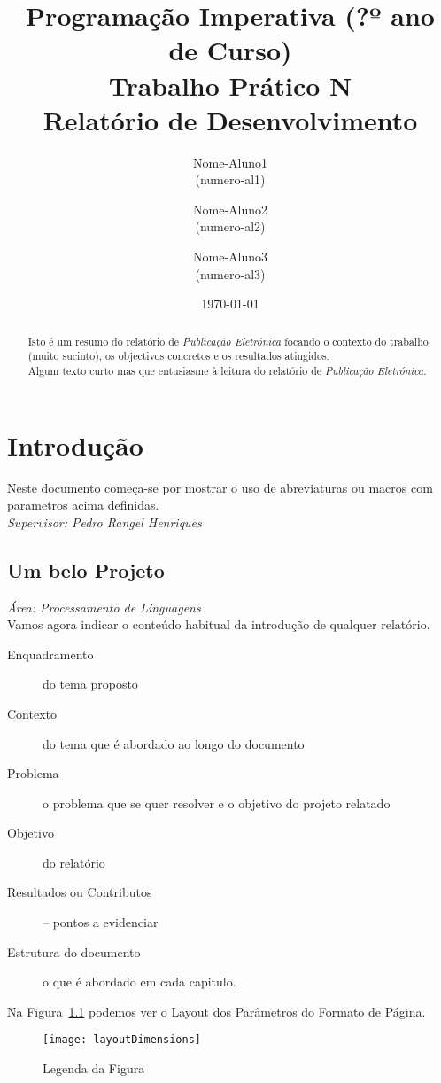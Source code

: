 \documentclass[11pt,a4paper]{report}%
\title{Programação Imperativa (?º ano de Curso)\\
       \textbf{Trabalho Prático N}\\ Relatório de Desenvolvimento
       } %
\author{Nome-Aluno1\\ (numero-al1) \and Nome-Aluno2\\ (numero-al2)
         \and Nome-Aluno3\\ (numero-al3)
       } %
\date{\today} %
\def\pe{\emph{Publicação Eletrónica}\xspace}
\def\titulo#1{\section{#1}}    %
\def\super#1{{\em Supervisor: #1}\\ }
\def\area#1{{\em \'{A}rea: #1}\\[0.2cm]}
\begin{document}
\maketitle %

\begin{abstract}  %
Isto é um resumo do relatório de \pe focando o contexto do trabalho (muito sucinto),
os objectivos concretos e os resultados atingidos.\\
Algum texto curto mas que entusiasme à leitura do relatório de \pe.
\end{abstract}

\tableofcontents %

\chapter{Introdução} \label{chap:intro} %

Neste documento começa-se por mostrar o uso de abreviaturas ou macros com parametros acima definidas.\\
\super{Pedro Rangel Henriques}
\titulo{Um belo Projeto}
\area{Processamento de Linguagens}

Vamos agora indicar o conteúdo habitual da introdução de qualquer relatório.
\begin{description}  %
  \item[Enquadramento]  do tema proposto
  \item[Contexto] do tema que é abordado ao  longo do documento
  \item[Problema] o problema que se quer resolver e o objetivo do projeto relatado
  \item[Objetivo] do relatório
  \item[Resultados ou Contributos] -- pontos a evidenciar
  \item[Estrutura do documento] o que é abordado em cada capitulo.
\end{description}

Na Figura~\ref{fig:layoutDimensions} podemos ver o Layout dos Parâmetros do Formato de Página.

 \begin{figure} %
       \centering %
       \texttt{[image: layoutDimensions]}
       \caption{Legenda da Figura} \label{fig:layoutDimensions} %
 \end{figure}
\end{document}
